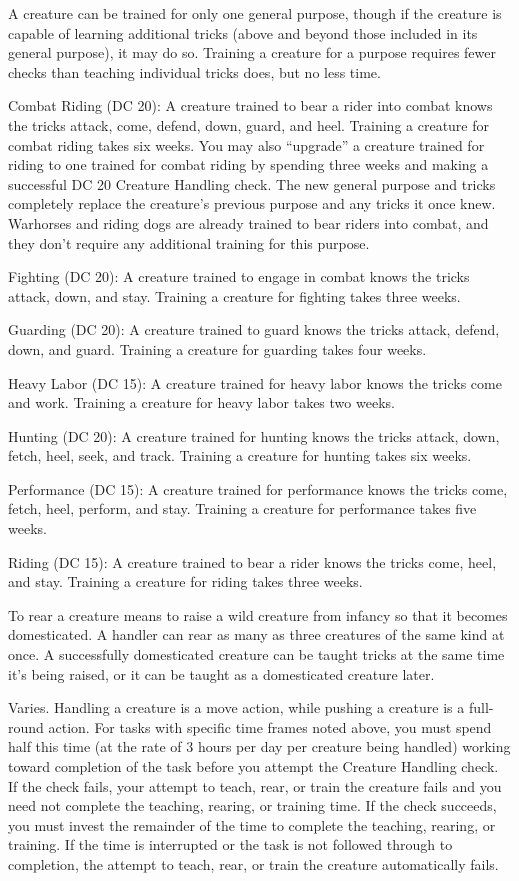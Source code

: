 A creature can be trained for only one general purpose, though if the creature is capable of learning additional tricks (above and beyond those included in its general purpose), it may do so. Training a creature for a purpose requires fewer checks than teaching individual tricks does, but no less time.

\par Combat Riding (DC 20): A creature trained to bear a rider into combat knows the tricks attack, come, defend, down, guard, and heel. Training a creature for combat riding takes six weeks. You may also ``upgrade'' a creature trained for riding to one trained for combat riding by spending three weeks and making a successful DC 20 Creature Handling check. The new general purpose and tricks completely replace the creature's previous purpose and any tricks it once knew. Warhorses and riding dogs are already trained to bear riders into combat, and they don't require any additional training for this purpose.
\par Fighting (DC 20): A creature trained to engage in combat knows the tricks attack, down, and stay. Training a creature for fighting takes three weeks.
\par Guarding (DC 20): A creature trained to guard knows the tricks attack, defend, down, and guard. Training a creature for guarding takes four weeks.
\par Heavy Labor (DC 15): A creature trained for heavy labor knows the tricks come and work. Training a creature for heavy labor takes two weeks.
\par Hunting (DC 20): A creature trained for hunting knows the tricks attack, down, fetch, heel, seek, and track. Training a creature for hunting takes six weeks.
\par Performance (DC 15): A creature trained for performance knows the tricks come, fetch, heel, perform, and stay. Training a creature for performance takes five weeks.
\par Riding (DC 15): A creature trained to bear a rider knows the tricks come, heel, and stay. Training a creature for riding takes three weeks.

 To rear a creature means to raise a wild creature from infancy so that it becomes domesticated. A handler can rear as many as three creatures of the same kind at once. A successfully domesticated creature can be taught tricks at the same time it's being raised, or it can be taught as a domesticated creature later.

 Varies. Handling a creature is a move action, while pushing a creature is a full-round action. For tasks with specific time frames noted above, you must spend half this time (at the rate of 3 hours per day per creature being handled) working toward completion of the task before you attempt the Creature Handling check. If the check fails, your attempt to teach, rear, or train the creature fails and you need not complete the teaching, rearing, or training time. If the check succeeds, you must invest the remainder of the time to complete the teaching, rearing, or training. If the time is interrupted or the task is not followed through to completion, the attempt to teach, rear, or train the creature automatically fails.

